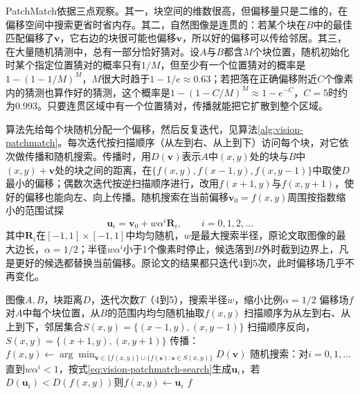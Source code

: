 PatchMatch依据三点观察。其一，块空间的维数很高，但偏移量只是二维的，在偏移空间中搜索更省时省内存。其二，自然图像是连贯的：若某个块在$B$中的最佳匹配偏移了$\bm{v}$，它右边的块很可能也偏移$\bm{v}$，所以好的偏移可以传给邻居。其三，在大量随机猜测中，总有一部分恰好猜对。设$A$与$B$都含$M$个块位置，随机初始化时某个指定位置猜对的概率只有$1/M$，但至少有一个位置猜对的概率是$1-(1-1/M)^M$，$M$很大时趋于$1-1/e\approx0.63$；若把落在正确偏移附近$C$个像素内的猜测也算作好的猜测，这个概率是$1-(1-C/M)^M\approx1-e^{-C}$，$C=5$时约为0.993。只要连贯区域中有一个位置猜对，传播就能把它扩散到整个区域。

算法先给每个块随机分配一个偏移，然后反复迭代，见算法\ref{alg:vision-patchmatch}。每次迭代按扫描顺序（从左到右、从上到下）访问每个块，对它依次做传播和随机搜索。传播时，用$D(\bm{v})$表示$A$中$(x,y)$处的块与$B$中$(x,y)+\bm{v}$处的块之间的距离，在$\{f(x,y),f(x-1,y),f(x,y-1)\}$中取使$D$最小的偏移；偶数次迭代按逆扫描顺序进行，改用$f(x+1,y)$与$f(x,y+1)$，使好的偏移也能向左、向上传播。随机搜索在当前偏移$\bm{v}_0=f(x,y)$周围按指数缩小的范围试探
\begin{equation}
 \bm{u}_i=\bm{v}_0+w\alpha^i\bm{R}_i,\qquad i=0,1,2,\ldots
 \label{eq:vision-patchmatch-search}
\end{equation}
其中$\bm{R}_i$在$[-1,1]\times[-1,1]$中均匀随机，$w$是最大搜索半径，原论文取图像的最大边长，$\alpha=1/2$；半径$w\alpha^i$小于1个像素时停止，候选落到$B$外时截到边界上，凡是更好的候选都替换当前偏移。原论文的结果都只迭代4到5次，此时偏移场几乎不再变化。

\begin{algorithm}[PatchMatch近似最近邻域场]
 \label{alg:vision-patchmatch}
 \begin{algorithmic}[1]
  \Require 图像$A,B$，块距离$D$，迭代次数$T$（4到5），搜索半径$w$，缩小比例$\alpha=1/2$
  \Ensure 偏移场$f$
  \State 对$A$中每个块位置，从$B$的范围内均匀随机抽取$f(x,y)$
    \State 扫描顺序为从左到右、从上到下，邻居集合$S(x,y)=\{(x-1,y),(x,y-1)\}$
   \Else
    \State 扫描顺序反向，$S(x,y)=\{(x+1,y),(x,y+1)\}$
   \EndIf
    \State 传播：$f(x,y)\gets\arg\min_{\bm{v}\in\{f(x,y)\}\cup\{f(\bm{s}):\bm{s}\in S(x,y)\}}D(\bm{v})$
    \State 随机搜索：对$i=0,1,\ldots$直到$w\alpha^i<1$，按式\eqref{eq:vision-patchmatch-search}生成$\bm{u}_i$，若$D(\bm{u}_i)<D(f(x,y))$则$f(x,y)\gets\bm{u}_i$
   \EndFor
  \EndFor
  \State \Return $f$
 \end{algorithmic}
\end{algorithm}

